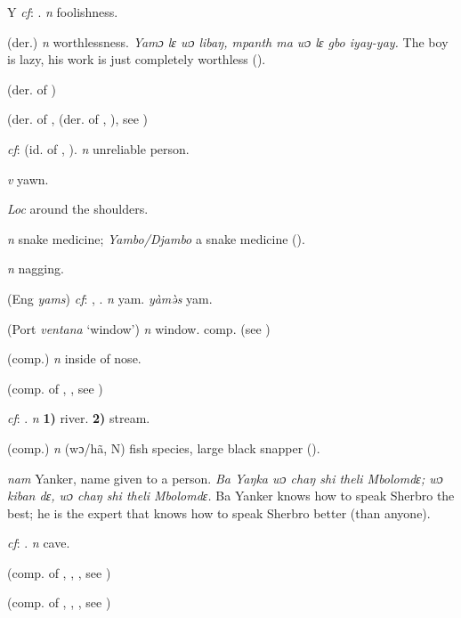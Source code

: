 \begin{letter}{Y}
 \textit{cf}: . \textit{n} foolishness.

 (der.) \textit{n} worthlessness. \textit{Yamɔ lɛ wɔ libaŋ, mpanth ma wɔ lɛ gbo iyay-yay.} The boy is lazy, his work is just completely worthless (\citealt{Pichl1967}). 

 (der. of ) 

 (der. of ,  (der. of , ), see ) 

 \textit{cf}:  (id. of , ). \textit{n} unreliable person.

 \textit{v} yawn.

 \textit{Loc} around the shoulders.

 \textit{n} snake medicine; \textit{Yambo/Djambo} a snake medicine (\citealt{Hall1938}). 

 \textit{n} nagging.

 (Eng \textit{yams}) \textit{cf}: , . \textit{n} yam. \textit{yàmə̀s} yam.

 (Port \textit{ventana} ‘window') \textit{n} window. comp.  (see ) 

 (comp.) \textit{n} inside of nose.

 (comp. of , , see ) 

 \textit{cf}: . \textit{n} \textbf{1)} river. \textbf{2)} stream.

 (comp.) \textit{n} (wɔ/hã, N) fish species, large black snapper (\citealt{Pichl1967}).

 \textit{nam} Yanker, name given to a person. \textit{Ba Yaŋka wɔ chaŋ shi theli Mbolomdɛ; wɔ kiban dɛ, wɔ chaŋ shi theli Mbolomdɛ.} Ba Yanker knows how to speak Sherbro the best; he is the expert that knows how to speak Sherbro better (than anyone).

 \textit{cf}: . \textit{n} cave.

 (comp. of , , , see ) 

 (comp. of , , , see ) 


\end{letter}
